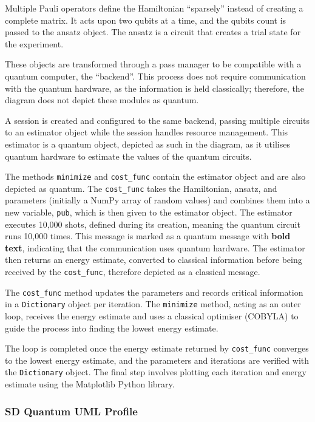 \documentclass{article}
\begin{document}
Multiple Pauli operators define the Hamiltonian “sparsely” instead of creating a complete matrix. It acts upon two qubits at a time, and the qubits count is passed to the ansatz object. The ansatz is a circuit that creates a trial state for the experiment. 

These objects are transformed through a pass manager to be compatible with a quantum computer, the “backend”. This process does not require communication with the quantum hardware, as the information is held classically; therefore, the diagram does not depict these modules as quantum.

A session is created and configured to the same backend, passing multiple circuits to an estimator object while the session handles resource management. This estimator is a quantum object, depicted as such in the diagram, as it utilises quantum hardware to estimate the values of the quantum circuits. 

The methods \texttt{minimize} and \texttt{cost\_func} contain the estimator object and are also depicted as quantum. The \texttt{cost\_func} takes the Hamiltonian, ansatz, and parameters (initially a NumPy array of random values) and combines them into a new variable, \texttt{pub}, which is then given to the estimator object. The estimator executes 10,000 shots, defined during its creation, meaning the quantum circuit runs 10,000 times. This message is marked as a quantum message with \textbf{bold text}, indicating that the communication uses quantum hardware. The estimator then returns an energy estimate, converted to classical information before being received by the \texttt{cost\_func}, therefore depicted as a classical message.

The \texttt{cost\_func} method updates the parameters and records critical information in a \texttt{Dictionary} object per iteration. The \texttt{minimize} method, acting as an outer loop, receives the energy estimate and uses a classical optimiser (COBYLA) to guide the process into finding the lowest energy estimate.

The loop is completed once the energy estimate returned by \texttt{cost\_func} converges to the lowest energy estimate, and the parameters and iterations are verified with the \texttt{Dictionary} object. The final step involves plotting each iteration and energy estimate using the Matplotlib Python library.

\subsubsection{SD Quantum UML Profile}
\end{document}
